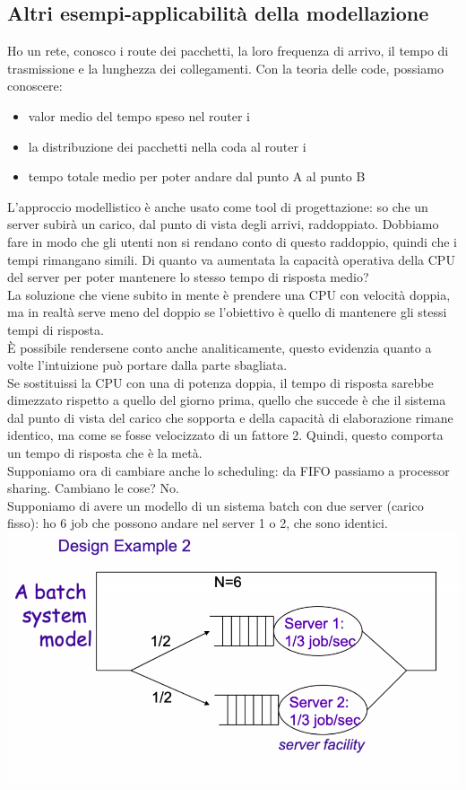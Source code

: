 \documentclass{article}
\begin{document}
\subsection{Altri esempi-applicabilità della modellazione}
Ho un rete, conosco i route dei pacchetti, la loro frequenza di arrivo, il tempo di trasmissione e la lunghezza dei collegamenti. Con la teoria delle code, possiamo conoscere:
\begin{itemize}
\item valor medio del tempo speso nel router i
\item la distribuzione dei pacchetti nella coda al router i
\item tempo totale medio per poter andare dal punto A al punto B
\end{itemize}
L'approccio modellistico è anche usato come tool di progettazione: so che un server subirà un carico, dal punto di vista degli arrivi, raddoppiato. Dobbiamo fare in modo che gli utenti non si rendano conto di questo raddoppio, quindi che i tempi rimangano simili. Di quanto va aumentata la capacità operativa della CPU del server per poter mantenere lo stesso tempo di risposta medio?\\ La soluzione che viene subito in mente è prendere una CPU con velocità doppia, ma in realtà serve meno del doppio se l'obiettivo è quello di mantenere gli stessi tempi di risposta.\\ È possibile rendersene conto anche analiticamente, questo evidenzia quanto a volte l'intuizione può portare dalla parte sbagliata.\\ Se sostituissi la CPU con una di potenza doppia, il tempo di risposta sarebbe dimezzato rispetto a quello del giorno prima, quello che succede è che il sistema dal punto di vista del carico che sopporta e della capacità di elaborazione rimane identico, ma come se fosse velocizzato di un fattore 2. Quindi, questo comporta un tempo di risposta che è la metà.\\ Supponiamo ora di cambiare anche lo scheduling: da FIFO passiamo a processor sharing. Cambiano le cose? No.\\ Supponiamo di avere un modello di un sistema batch con due server (carico fisso): ho 6 job che possono andare nel server 1 o 2, che sono identici.\\ 
\includegraphics[scale=0.2]{images/PMCSN-2.png}\\
\end{document}
